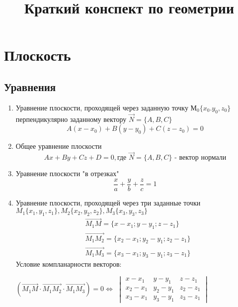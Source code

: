 \documentclass[a4paper,14pt]{extreport} %
\title{Краткий конспект по геометрии}
\author{}
\date{}
\begin{document}
\section{Плоскость} 
  \subsection{Уравнения}
  \begin{enumerate}
    \item Уравнение плоскости, проходящей через заданную точку $М_0\{x_0.y_0,z_0\}$ перпендикулярно заданному вектору   $\vec{N} = \{A,B,C\}$ 
    \[
      A(x-x_0) + B(y-y_0) + C(z-z_0) = 0
    \]
    \item Общее уравнение плоскости
      \[
        Ax + By + Cz + D = 0, \text{где $\vec{N} = \{A,B,C\}$ - вектор нормали}
      \]
    \item Уравнение плоскости "в отрезках"
      \[
        \frac{x}{a} + \frac{y}{b} + \frac{z}{c} = 1
      \]
    \item Уравнение плоскости, проходящей через три заданные точки\\
      $M_1\{x_1,y_1,z_1\}, M_2\{x_2,y_2,z_2\}, M_3\{x_3,y_3,z_3\}$
      \begin{align}
       &\overrightarrow{M_1M} = \{x-x_1;y-y_1;z-z_1\} \\
       &\overrightarrow{M_1M_2} = \{x_2-x_1;y_2-y_1;z_2-z_1\}  \\
       &\overrightarrow{M_1M_3} = \{x_3-x_1;y_3-y_1;z_3-z_1\}
      \end{align}
      Условие компланарности векторов:

        \begin{center}
          $ ( \overrightarrow{M_1M} \cdot \overrightarrow{M_1M_2} \cdot \overrightarrow{M_1M_3}) = 0  \Leftrightarrow $
          $\begin{vmatrix}
            x-x_1&y-y_1&z-z_1\\ 
            x_2-x_1&y_2-y_1&z_2-z_1\\
            x_3-x_1&y_3-y_1&z_3-z_1
          \end{vmatrix}$
        \end{center}

  \end{enumerate}
\end{document}

